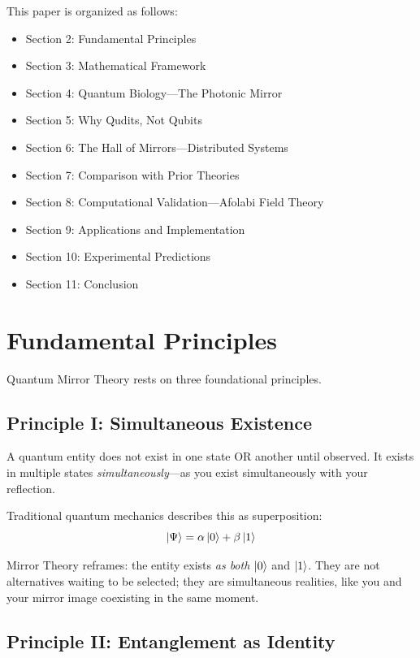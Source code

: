 \documentclass[12pt,a4paper]{article}
\begin{document}
This paper is organized as follows:
\begin{itemize}
    \item Section 2: Fundamental Principles
    \item Section 3: Mathematical Framework
    \item Section 4: Quantum Biology---The Photonic Mirror
    \item Section 5: Why Qudits, Not Qubits
    \item Section 6: The Hall of Mirrors---Distributed Systems
    \item Section 7: Comparison with Prior Theories
    \item Section 8: Computational Validation---Afolabi Field Theory
    \item Section 9: Applications and Implementation
    \item Section 10: Experimental Predictions
    \item Section 11: Conclusion
\end{itemize}

\section{Fundamental Principles}

Quantum Mirror Theory rests on three foundational principles.

\subsection{Principle I: Simultaneous Existence}

A quantum entity does not exist in one state OR another until observed. It exists in multiple states \textit{simultaneously}---as you exist simultaneously with your reflection.

Traditional quantum mechanics describes this as superposition:
\begin{equation}
\ket{\Psi} = \alpha\ket{0} + \beta\ket{1}
\end{equation}

Mirror Theory reframes: the entity exists \textit{as both} $\ket{0}$ and $\ket{1}$. They are not alternatives waiting to be selected; they are simultaneous realities, like you and your mirror image coexisting in the same moment.

\subsection{Principle II: Entanglement as Identity}
\end{document}
